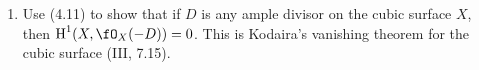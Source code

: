 \documentclass[a4paper]{article}
\begin{document}
\begin{enumerate} [label=\textbf{\arabic*.}, leftmargin=0em]

      \item[\textbf{12.}] Use (4.11) to show that if $D$ is any ample divisor on the cubic surface $X$, then $\cH^1(X, \fO_X(-D)) = 0$.
            This is Kodaira's vanishing theorem for the cubic surface (III, 7.15).


\end{enumerate}
\end{document}
